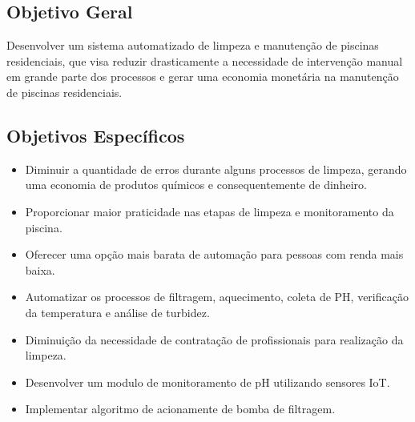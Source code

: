 
\subsection{Objetivo Geral}

Desenvolver um sistema automatizado de limpeza e manutenção de piscinas residenciais, que visa reduzir drasticamente a necessidade de intervenção manual em grande parte dos processos e gerar uma economia monetária na manutenção de piscinas residenciais. 
  
\subsection{Objetivos Específicos}

\begin{itemize}
\item Diminuir a quantidade de erros durante alguns processos de limpeza, gerando uma economia de produtos químicos e consequentemente de dinheiro.
\item Proporcionar maior praticidade nas etapas de limpeza e monitoramento da piscina.
\item Oferecer uma opção mais barata de automação para pessoas com renda mais baixa.
\item Automatizar os processos de filtragem, aquecimento, coleta de PH, verificação da temperatura e análise de turbidez.
\item Diminuição da necessidade de contratação de profissionais para realização da limpeza.
\item Desenvolver um modulo de monitoramento de pH utilizando sensores IoT.
\item Implementar algoritmo de acionamente de bomba de filtragem.
\end{itemize}
